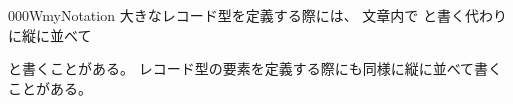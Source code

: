 \documentclass[index]{subfiles}
\begin{document}
\begin{myBlock}{000W}{myNotation}
  大きなレコード型を定義する際には、
  文章内で
  と書く代わりに縦に並べて
  \begin{myDisplayMath}
  \end{myDisplayMath}
  と書くことがある。
  レコード型の要素を定義する際にも同様に縦に並べて書くことがある。
\end{myBlock}
\end{document}
